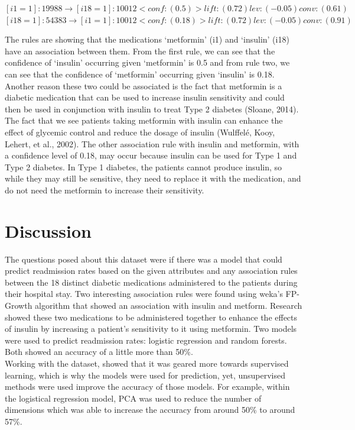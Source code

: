 \documentclass{neu_handout}
\begin{document}
\begin{adjustwidth}{2cm}{}
$[i1=1]: 19988 \longrightarrow [i18=1]: 10012   <conf:(0.5)> lift:(0.72) lev:(-0.05) conv:(0.61)$ \\
$[i18=1]: 54383 \longrightarrow [i1=1]: 10012   <conf:(0.18)> lift:(0.72) lev:(-0.05) conv:(0.91) $ \\
\end{adjustwidth}

The rules are showing that the medications ‘metformin’ (i1) and ‘insulin’ (i18) have an association between them. From the first rule, we can see that the confidence of ‘insulin’ occurring given ‘metformin’ is 0.5 and from rule two, we can see that the confidence of ‘metformin’ occurring given ‘insulin’ is 0.18.  
Another reason these two could be associated is the fact that metformin is a diabetic medication that can be used to increase insulin sensitivity and could then be used in conjunction with insulin to treat Type 2 diabetes (Sloane, 2014). The fact that we see patients taking metformin with insulin can enhance the effect of glycemic control and reduce the dosage of insulin (Wulffelé, Kooy, Lehert, et al., 2002).
The other association rule with insulin and metformin, with a confidence level of 0.18, may occur because insulin can be used for Type 1 and Type 2 diabetes. In Type 1 diabetes, the patients cannot produce insulin, so while they may still be sensitive, they need to replace it with the medication, and do not need the metformin to increase their sensitivity. 

\section*{Discussion}
The questions posed about this dataset were if there was a model that could predict readmission rates based on the given attributes and any association rules between the 18 distinct diabetic medications administered to the patients during their hospital stay. Two interesting association rules were found using weka's FP-Growth algorithm that showed an association with insulin and metform. Research showed these two medications to be administered together to enhance the effects of insulin by increasing a patient's sensitivity to it using metformin. 
Two models were used to predict readmission rates: logistic regression and random forests. Both showed an accuracy of a little more than 50\%. \\ 

Working with the dataset, showed that it was geared more towards supervised learning, which is why the models were used for prediction, yet, unsupervised methods were used improve the accuracy of those models. For example, within the logistical regression model, PCA was used to reduce the number of dimensions which was able to increase the accuracy from around 50\% to around 57\%. \\
\end{document}

